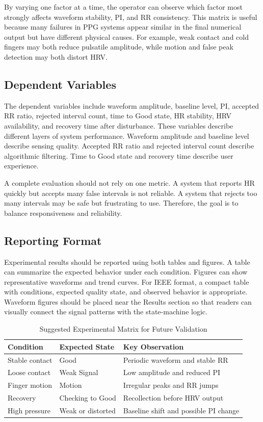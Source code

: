 \documentclass[10pt,conference]{IEEEtran}
\begin{document}
By varying one factor at a time, the operator can observe which factor most strongly affects waveform stability, PI, and RR consistency. This matrix is useful because many failures in PPG systems appear similar in the final numerical output but have different physical causes. For example, weak contact and cold fingers may both reduce pulsatile amplitude, while motion and false peak detection may both distort HRV.

\subsection{Dependent Variables}
The dependent variables include waveform amplitude, baseline level, PI, accepted RR ratio, rejected interval count, time to Good state, HR stability, HRV availability, and recovery time after disturbance. These variables describe different layers of system performance. Waveform amplitude and baseline level describe sensing quality. Accepted RR ratio and rejected interval count describe algorithmic filtering. Time to Good state and recovery time describe user experience.

A complete evaluation should not rely on one metric. A system that reports HR quickly but accepts many false intervals is not reliable. A system that rejects too many intervals may be safe but frustrating to use. Therefore, the goal is to balance responsiveness and reliability.

\subsection{Reporting Format}
Experimental results should be reported using both tables and figures. A table can summarize the expected behavior under each condition. Figures can show representative waveforms and trend curves. For IEEE format, a compact table with conditions, expected quality state, and observed behavior is appropriate. Waveform figures should be placed near the Results section so that readers can visually connect the signal patterns with the state-machine logic.

\begin{table}[t]
\centering
\caption{Suggested Experimental Matrix for Future Validation}
\label{tab:matrix}
\begin{tabular}{p{1.9cm}p{2.2cm}p{3.0cm}}
\toprule
\textbf{Condition} & \textbf{Expected State} & \textbf{Key Observation} \\
\midrule
Stable contact & Good & Periodic waveform and stable RR \\
Loose contact & Weak Signal & Low amplitude and reduced PI \\
Finger motion & Motion & Irregular peaks and RR jumps \\
Recovery & Checking to Good & Recollection before HRV output \\
High pressure & Weak or distorted & Baseline shift and possible PI change \\
\bottomrule
\end{tabular}
\end{table}
\end{document}
